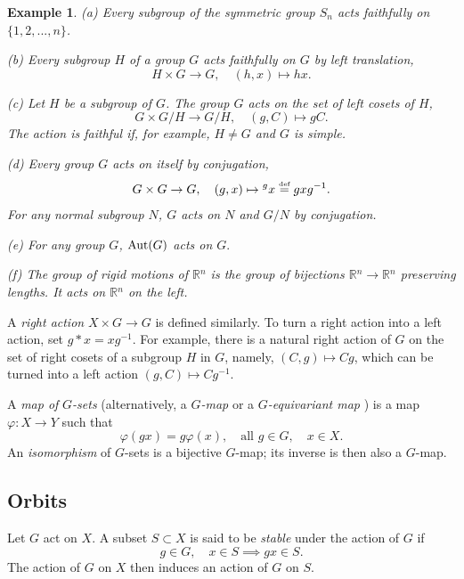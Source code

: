 \documentclass[a4paper,11pt,final]{memoir}%
\newtheorem{example}[X]{Example}
\theoremstyle{nonumberplain}
\begin{document}
\begin{example}
\label{ga02} (a) Every subgroup of the symmetric group $S_{n}$ acts faithfully
on $\{1,2,...,n\}$.

(b) Every subgroup $H$ of a group $G$ acts faithfully on $G$ by left
translation,
\[
H\times G\rightarrow G,\quad(h,x)\mapsto hx.
\]


(c) Let $H$ be a subgroup of $G$. The group $G$ acts on the set of left cosets
of $H$,
\[
G\times G/H\rightarrow G/H,\quad(g,C)\mapsto gC.
\]
The action is faithful if, for example, $H\neq G$ and $G$ is simple.

(d) Every group $G$ acts on itself by conjugation,
\[
G\times G\rightarrow G,\quad(g,x)\mapsto{}^{g}x\overset{\text{{\tiny def}}%
}{=}gxg^{-1}.
\]
For any normal subgroup $N$, $G$ acts on $N$ and $G/N$ by conjugation.

(e) For any group $G$, $\operatorname{Aut}(G)$ acts on $G.$

(f) The \emph{group of rigid motions}%
of $\mathbb{R}{}^{n}$ is the group of bijections $\mathbb{R}{}^{n}%
\rightarrow\mathbb{R}{}^{n}$ preserving lengths. It acts on $\mathbb{R}{}^{n}$
on the left.
\end{example}

A \emph{right action}%
$X\times G\rightarrow G$ is defined similarly. To turn a right action into a
left action, set $g\ast x=xg^{-1}$. For example, there is a natural right
action of $G$ on the set of right cosets of a subgroup $H$ in $G$, namely,
$(C,g)\mapsto Cg$, which can be turned into a left action $(g,C)\mapsto
Cg^{-1}$.

A \emph{map of }$G$\emph{-sets}%
(alternatively, a $G$\emph{-map\/}%
or a $G$\emph{-equivariant map}%
%
\emph{\/}) is a map $\varphi\colon X\rightarrow Y$ such that
\[
\varphi(gx)=g\varphi(x),\quad\text{all }g\in G,\quad x\in X.
\]
An \emph{isomorphism}%
%
\emph{\/} of $G$-sets is a bijective $G$-map; its inverse is then also a $G$-map.

\subsection{Orbits}

Let $G$ act on $X$. A subset $S\subset X$ is said to be \emph{stable\/}%
under the action of $G$ if
\[
g\in G,\quad x\in S\implies gx\in S.
\]
The action of $G$ on $X$ then induces an action of $G$ on $S$.
\end{document}
